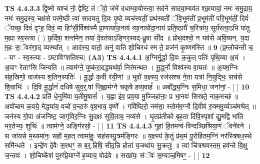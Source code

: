 \documentclass[17pt]{extarticle}
\begin{document}
                  \newline
                                \textbf{ TS 4.4.3.3} \newline
                  द्वि॒ष्मो यश्च॑ नो॒ द्वेष्टि॒ तं ॅवो॒ जंभे॑ दधाम्या॒योस्त्वा॒ सद॑ने सादया॒म्यव॑त श्छा॒यायां॒ नमः॑ समु॒द्राय॒ नमः॑ समु॒द्रस्य॒ चक्ष॑से परमे॒ष्ठी त्वा॑ सादयतु दि॒वः पृ॒ष्ठे व्यच॑स्वतीं॒ प्रथ॑स्वतीं ॅवि॒भूम॑तीं प्र॒भूम॑तीं परि॒भूम॑तीं॒ दिवं॑ ॅयच्छ॒ दिवं॑ दृꣳह॒ दिवं॒ मा हिꣳ॑सी॒र्विश्व॑स्मै प्रा॒णाया॑पा॒नाय॑ व्या॒नायो॑दा॒नाय॑ प्रति॒ष्ठायै॑ च॒रित्रा॑य॒ सूर्य॑स्त्वा॒ऽभि पा॑तु म॒ह्या स्व॒स्त्या ( ) छ॒र्दिषा॒ शन्त॑मेन॒ तया॑ दे॒वत॑याऽङ्गिर॒स्वद्-ध्रु॒वा सी॑द ॥ प्रोथ॒दश्वो॒ न यव॑से अवि॒ष्यन्. य॒दा म॒हः स॒ॅवर॑णा॒द् व्यस्था᳚त् । आद॑स्य॒ वातो॒ अनु॑ वाति शो॒चिरध॑ स्म ते॒ व्रज॑नं कृ॒ष्णम॑स्ति ॥ \textbf{  9} \newline
                  \newline
                      (प्र॒म्लोच॑न्ती च॒ - यꣳ - स्व॒स्त्या - ऽष्टाविꣳ॑शतिश्च)  \textbf{(A3)} \newline \newline
                                        \textbf{ TS 4.4.4.1} \newline
                  अ॒ग्निर्मू॒र्द्धा दि॒वः क॒कुत् पतिः॑ पृथि॒व्या अ॒यं । अ॒पाꣳ रेताꣳ॑सि जिन्वति ॥ त्वाम॑ग्ने॒ पुष्क॑रा॒दद्ध्यथ॑र्वा॒ निर॑मन्थत । मू॒र्द्ध्नो विश्व॑स्य वा॒घतः॑ ॥ अ॒यम॒ग्निः स॑ह॒स्रिणो॒ वाज॑स्य श॒तिन॒स्पतिः॑ । मू॒र्द्धा क॒वी र॑यी॒णां ॥ भुवो॑ य॒ज्ञ्स्य॒ रज॑सश्च ने॒ता यत्रा॑ नि॒युद्भिः॒ सच॑से शि॒वाभिः॑ । दि॒वि मू॒र्द्धानं॑ दधिषे सुव॒र्॒.षां जि॒ह्वाम॑ग्ने चकृषे हव्य॒वाहं᳚ ॥ अबो᳚द्ध्य॒ग्निः स॒मिधा॒ जना॑नां॒ - [  ] \textbf{  10} \newline
                  \newline
                                \textbf{ TS 4.4.4.2} \newline
                  प्रति॑ धे॒नुमि॑वा य॒तीमु॒षासं᳚ । य॒ह्वा इ॑व॒ प्रव॒या मु॒ज्जिहा॑नाः॒ प्र भा॒नवः॑ सिस्रते॒ नाक॒मच्छ॑ ॥ अवो॑चाम क॒वये॒ मेद्ध्या॑य॒ वचो॑ व॒न्दारु॑ वृष॒भाय॒ वृष्णे᳚ । गवि॑ष्ठिरो॒ नम॑सा॒ स्तोम॑म॒ग्नौ दि॒वीव॑ रु॒क्ममु॒र्व्यञ्च॑मश्रेत् ॥ जन॑स्य गो॒पा अ॑जनिष्ट॒ जागृ॑विर॒ग्निः सु॒दक्षः॑ सुवि॒ताय॒ नव्य॑से । घृ॒तप्र॑तीको बृह॒ता दि॑वि॒स्पृशा᳚ द्यु॒मद्वि भा॑ति भर॒तेभ्यः॒ शुचिः॑ ॥ त्वाम॑ग्ने॒ अङ्गि॑रसो॒ - [  ] \textbf{  11} \newline
                  \newline
                                \textbf{ TS 4.4.4.3} \newline
                  गुहा॑ हि॒तमन्व॑-विन्दञ्छिश्रिया॒णं ॅवने॑वने । स जा॑यसे म॒थ्यमा॑नः॒ सहो॑ म॒हत् त्वामा॑हुः॒ सह॑सस्पु॒त्रम॑ङ्गिरः ॥ य॒ज्ञ्स्य॑ के॒तुं प्र॑थ॒मं पु॒रोहि॑तम॒ग्निं नर॑स्त्रिषध॒स्थे समि॑न्धते । इन्द्रे॑ण दे॒वैः स॒रथꣳ॒॒ स ब॒र्॒.हिषि॒ सीद॒न्नि होता॑ य॒जथा॑य सु॒क्रतुः॑ ॥ त्वां चि॑त्रश्रवस्तम॒ हव॑न्ते वि॒क्षु ज॒न्तवः॑ । शो॒चिष्के॑शं पुरुप्रि॒याग्ने॑ ह॒व्याय॒ वोढ॑वे ॥ सखा॑यः॒ संॅवः॑ स॒म्यञ्च॒मिषꣳ॒॒ - [  ] \textbf{  12} \newline
\end{document}
